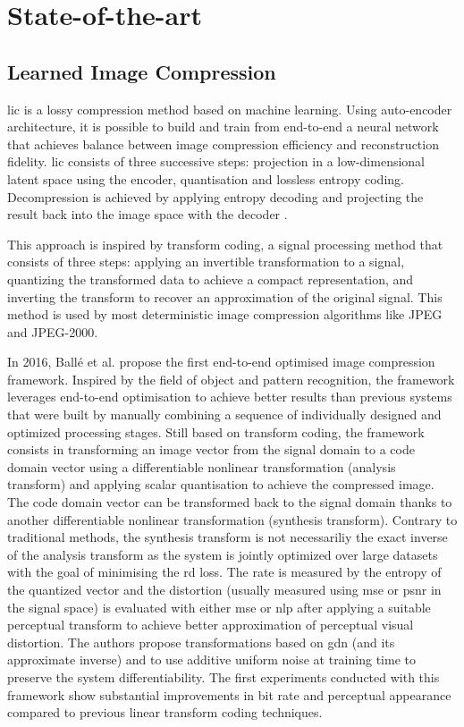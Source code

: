\chapter{State-of-the-art}
\label{sota}

\section{Learned Image Compression}
\acrfull{lic} is a lossy compression method based on machine learning. Using auto-encoder architecture, it is possible to build and train from end-to-end a neural network that achieves balance between image compression efficiency and reconstruction fidelity. \acrshort{lic} consists of three successive steps: projection in a low-dimensional latent space using the encoder, quantisation and lossless entropy coding. Decompression is achieved by applying entropy decoding and projecting the result back into the image space with the decoder \cite{licmedium, licstanford}.

This approach is inspired by transform coding, a signal processing method that consists of three steps: applying an invertible transformation to a signal, quantizing the transformed data to achieve a compact representation, and inverting the transform to recover an approximation of the original signal. This method is used by most deterministic image compression algorithms like JPEG and JPEG-2000.

In 2016, Ballé et al. \cite{ballé2016endtoendoptimizationnonlineartransform} propose the first end-to-end optimised image compression framework. Inspired by the field of object and pattern recognition, the framework leverages end-to-end optimisation to achieve better results than previous systems that were built by manually combining a sequence of individually designed and optimized processing stages. Still based on transform coding, the framework consists in transforming an image vector from the signal domain to a code domain vector using a differentiable nonlinear transformation (analysis transform) and applying scalar quantisation to achieve the compressed image. The code domain vector can be transformed back to the signal domain thanks to another differentiable nonlinear transformation (synthesis transform). Contrary to traditional methods, the synthesis transform is not necessariliy the exact inverse of the analysis transform as the system is jointly optimized over large datasets with the goal of minimising the \acrshort{rd} loss. The rate is measured by the entropy of the quantized vector and the distortion (usually measured using \acrfull{mse} or \acrfull{psnr} in the signal space) is evaluated with either \acrshort{mse} or \acrfull{nlp} after applying a suitable perceptual transform to achieve better approximation of perceptual visual distortion. The authors propose transformations based on \acrfull{gdn} (and its approximate inverse) and to use additive uniform noise at training time to preserve the system differentiability. The first experiments conducted with this framework show substantial improvements in bit rate and perceptual appearance compared to previous linear transform coding techniques.

